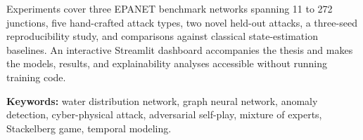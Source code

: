 Experiments cover three EPANET benchmark networks spanning
11 to 272 junctions, five hand-crafted attack types, two novel
held-out attacks, a three-seed reproducibility study, and comparisons
against classical state-estimation baselines. An interactive
Streamlit dashboard accompanies the thesis and makes the models,
results, and explainability analyses accessible without running
training code.

\vspace{1em}
\noindent\textbf{Keywords:} water distribution network, graph neural
network, anomaly detection, cyber-physical attack, adversarial self-play,
mixture of experts, Stackelberg game, temporal modeling.
